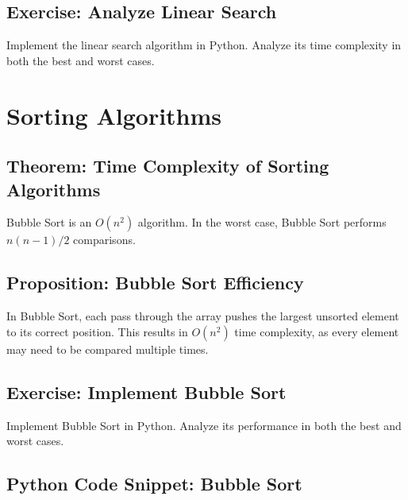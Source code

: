 \subsection{Exercise: Analyze Linear Search}
\begin{exercise}
Implement the linear search algorithm in Python. Analyze its time complexity in both the best and worst cases.
\end{exercise}

\begin{example}
    \centering
\end{example}


\section{Sorting Algorithms}

\subsection{Theorem: Time Complexity of Sorting Algorithms}
\begin{theorem}
Bubble Sort is an $O(n^2)$ algorithm. In the worst case, Bubble Sort performs $n(n-1)/2$ comparisons.
\end{theorem}

\subsection{Proposition: Bubble Sort Efficiency}
\begin{prop}
In Bubble Sort, each pass through the array pushes the largest unsorted element to its correct position. This results in $O(n^2)$ time complexity, as every element may need to be compared multiple times.
\end{prop}

\subsection{Exercise: Implement Bubble Sort}
\begin{exercise}
Implement Bubble Sort in Python. Analyze its performance in both the best and worst cases.
\end{exercise}

\subsection{Python Code Snippet: Bubble Sort}
\begin{codesnippet}
\end{codesnippet}


